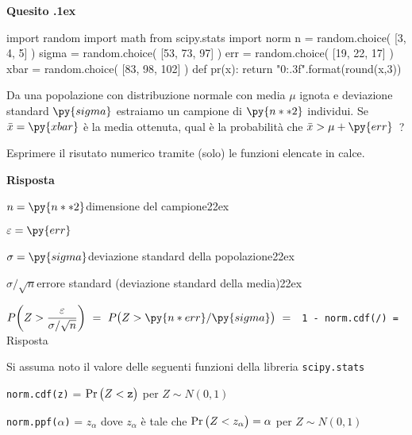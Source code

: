 \documentclass[11pt,twoside,a4paper]{article}
\def\Pr{{\rm Pr\,}}
\newcounter{quesito}
\newenvironment{question}{\addtocounter{quesito}{1}\bigskip\bigskip\par\textbf{Quesito \thequesito.\kern1ex}}{\vspace{\parskip}}
\newenvironment{answer}{\par\textbf{Risposta\quad}}{\vspace{\parskip}}
\begin{document}
\clearpage
\begin{question} %
\begin{pycode}
import random
import math
from scipy.stats import norm
n = random.choice( [3, 4, 5] )
sigma = random.choice( [53, 73, 97] )
err = random.choice( [19, 22, 17] )
xbar = random.choice( [83, 98, 102] )
def pr(x):
    return "{0:.3f}".format(round(x,3))

\end{pycode}
Da una popolazione con distribuzione normale con media $\mu$ ignota e deviazione standard $\py{sigma}$ estraiamo un campione di $\py{n**2}$ individui. Se $\bar x= \py{xbar}$ è la media ottenuta, qual è la probabilità che $\bar x>\mu+ \py{err}$~? 
    
Esprimere il risutato numerico tramite (solo) le funzioni elencate in calce.

\begin{answer}
  
  $n = \py{n**2}$\hfill dimensione del campione\kern22ex
  
  $\varepsilon = \py{err}$ 
  
  $\sigma = \py{sigma}$\hfill deviazione standard della popolazione\kern22ex
  
  $\sigma/\sqrt{n}$\hfill errore standard (deviazione standard della media)\kern22ex
  
  $P\bigg(Z>\dfrac {\varepsilon}{\sigma/\sqrt{n}}\bigg)\ =\ P\big(Z>\py{n * err}/\py{sigma}\big)\ =\ ${\color{blue}\tt\ 1 - norm.cdf(/)}{\tt\ =  }{\color{blue}\hfill Risposta}

\end{answer}
\end{question}


\vfill
\hrulefill

Si assuma noto il valore delle seguenti funzioni della libreria {\tt scipy.stats\/}

{\tt norm.cdf(z)} = $\Pr\big(Z<{\tt z}\big)$ per $Z\sim N(0,1)$ 

{\tt norm.ppf($\alpha$)} = $z_\alpha$ dove $z_\alpha$ è tale che $\Pr\big(Z<z_\alpha\big)=\alpha$ per $Z\sim N(0,1)$ 
\end{document}
